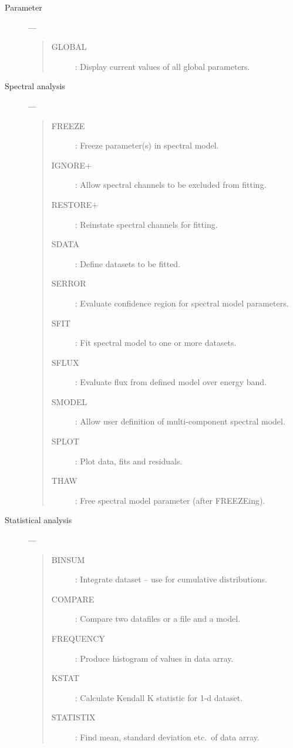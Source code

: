 \begin{description}
\item [Parameter] ---
\begin{quote}
\begin{description}
\item [GLOBAL] :   Display current values of all global parameters.
\end{description}
\end{quote}

\item [Spectral analysis] ---
\begin{quote}
\begin{description}
\item [FREEZE] :   Freeze parameter(s) in spectral model.
\item [IGNORE+] :  Allow spectral channels to be excluded from fitting.
\item [RESTORE+] : Reinstate spectral channels for fitting.
\item [SDATA] :    Define datasets to be fitted.
\item [SERROR] :   Evaluate confidence region for spectral model parameters.
\item [SFIT] :     Fit spectral model to one or more datasets.
\item [SFLUX] :    Evaluate flux from defined model over energy band.
\item [SMODEL] :   Allow user definition of multi-component spectral model.
\item [SPLOT] :    Plot data, fits and residuals.
\item [THAW] :     Free spectral model parameter (after FREEZEing).
\end{description}
\end{quote}

\item [Statistical analysis] ---
\begin{quote}
\begin{description}
\item [BINSUM] :   Integrate dataset -- use for cumulative distributions.
\item [COMPARE] :  Compare two datafiles or a file and a model.
\item [FREQUENCY] : Produce histogram of values in data array.
\item [KSTAT] :    Calculate Kendall K statistic for 1-d dataset.
\item [STATISTIX] : Find mean, standard deviation etc.\ of data array.
\end{description}
\end{quote}


\end{description}
